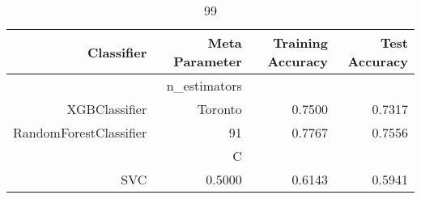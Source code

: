 
\begin{table}[H]
    \caption{99}
    \centering
    \begin{tabular}{|r|r|r|r|}
        \hline
        Classifier &Meta Parameter &Training Accuracy
        &Test Accuracy\\
        \hline
        &n\_estimators &\multicolumn{2}{|r|}{}\\
        \hline
        XGBClassifier &Toronto &0.7500 &0.7317\\
        \hline
        RandomForestClassifier &91 &0.7767 &0.7556\\
        \hline
        &C &\multicolumn{2}{|r|}{}\\
        \hline
        SVC &0.5000 &0.6143 &0.5941\\
        \hline
    \end{tabular}
\end{table}
